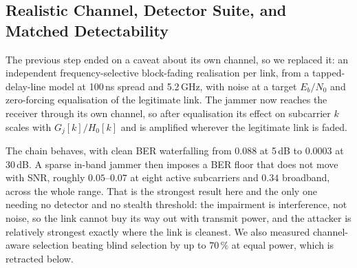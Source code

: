 %
%
%

\subsection{Realistic Channel, Detector Suite, and Matched Detectability}
\label{subsec:exphist:realistic}
The previous step ended on a caveat about its own channel, so we replaced it: an independent
frequency-selective block-fading realisation per link, from a tapped-delay-line model at 100\,ns spread
and 5.2\,GHz, with noise at a target $E_b/N_0$ and zero-forcing equalisation of the legitimate link.
The jammer now reaches the receiver through its own channel, so after equalisation its effect on
subcarrier $k$ scales with $G_j[k]/H_0[k]$ and is amplified wherever the legitimate link is faded.

The chain behaves, with clean BER waterfalling from $0.088$ at 5\,dB to $0.0003$ at 30\,dB.
A sparse in-band jammer then imposes a BER floor that does not move with SNR, roughly $0.05$--$0.07$ at
eight active subcarriers and $0.34$ broadband, across the whole range.
That is the strongest result here and the only one needing no detector and no stealth threshold: the
impairment is interference, not noise, so the link cannot buy its way out with transmit power, and the
attacker is relatively strongest exactly where the link is cleanest.
We also measured channel-aware selection beating blind selection by up to $70\,\%$ at equal power, which
is retracted below.

